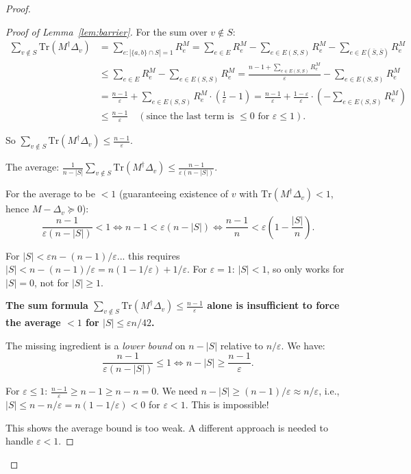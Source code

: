 \documentclass[12pt]{article}
\theoremstyle{definition}
\begin{document}
\begin{proof}
\begin{proof}[Proof of Lemma~\ref{lem:barrier}]
For the sum over $v\notin S$:
\begin{align}\label{eq:sum-RM}
\sum_{v\notin S}\mathrm{Tr}(M^\dagger\Delta_v) &= \sum_{e:|\{a,b\}\cap S|=1}R_e^M = \sum_{e\in E}R_e^M - \sum_{e\in E(S,S)}R_e^M - \sum_{e\in E(\bar S,\bar S)}R_e^M \nonumber\\
&\leq \sum_{e\in E}R_e^M - \sum_{e\in E(S,S)}R_e^M = \frac{n-1+\sum_{e\in E(S,S)}R_e^M}{\varepsilon} - \sum_{e\in E(S,S)}R_e^M\nonumber\\
&= \frac{n-1}{\varepsilon} + \sum_{e\in E(S,S)}R_e^M\cdot\left(\frac{1}{\varepsilon}-1\right) = \frac{n-1}{\varepsilon} + \frac{1-\varepsilon}{\varepsilon}\cdot(-\sum_{e\in E(S,S)}R_e^M)\nonumber\\
&\leq \frac{n-1}{\varepsilon} \quad (\text{since the last term is }\leq 0\text{ for }\varepsilon\leq 1).
\end{align}

So $\sum_{v\notin S}\mathrm{Tr}(M^\dagger\Delta_v) \leq \frac{n-1}{\varepsilon}$.

The average: $\frac{1}{n-|S|}\sum_{v\notin S}\mathrm{Tr}(M^\dagger\Delta_v)\leq\frac{n-1}{\varepsilon(n-|S|)}$.

For the average to be $< 1$ (guaranteeing existence of $v$ with $\mathrm{Tr}(M^\dagger\Delta_v) < 1$, hence $M-\Delta_v\succeq 0$):
$$\frac{n-1}{\varepsilon(n-|S|)} < 1 \iff n-1 < \varepsilon(n-|S|) \iff \frac{n-1}{n} < \varepsilon\left(1-\frac{|S|}{n}\right).$$

For $|S| < \varepsilon n - (n-1)/\varepsilon$... this requires $|S| < n - (n-1)/\varepsilon = n(1 - 1/\varepsilon) + 1/\varepsilon$. For $\varepsilon = 1$: $|S| < 1$, so only works for $|S| = 0$, not for $|S|\geq 1$.

\textbf{The sum formula $\sum_{v\notin S}\mathrm{Tr}(M^\dagger\Delta_v)\leq\frac{n-1}{\varepsilon}$ alone is insufficient to force the average $< 1$ for $|S|\leq\varepsilon n/42$.}

The missing ingredient is a \emph{lower bound} on $n-|S|$ relative to $n/\varepsilon$. We have:
$$\frac{n-1}{\varepsilon(n-|S|)}\leq 1 \iff n-|S|\geq\frac{n-1}{\varepsilon}.$$

For $\varepsilon\leq 1$: $\frac{n-1}{\varepsilon}\geq n-1 \geq n - n = 0$. We need $n-|S|\geq(n-1)/\varepsilon\approx n/\varepsilon$, i.e., $|S|\leq n - n/\varepsilon = n(1-1/\varepsilon) < 0$ for $\varepsilon < 1$. This is impossible!

This shows the average bound is too weak. A different approach is needed to handle $\varepsilon < 1$.


\end{proof}
\end{proof}
\end{document}
